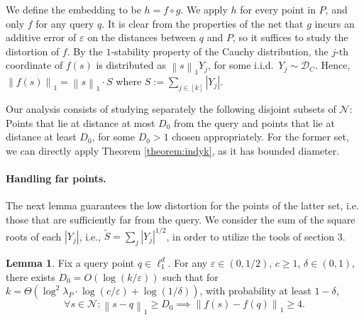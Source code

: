 \documentclass[10pt,a4paper,twoside]{book}
\newcommand{\cauchy}{\mathcal{D}_C}
\newcommand{\eps}{\varepsilon}
\newcommand{\net}{\mathcal{N}}
\newcommand{\norm}[1]{\left \rVert {#1} \right \rVert}
\theoremstyle{definition}
\newtheorem{lemma}[definition]{Lemma}
\theoremstyle{remark}
\begin{document}
We define the embedding to be $h = f \circ g$. We apply $h$ for every point in $P$, and only $f$ for any query $q$. It is clear from the properties of the net that $g$ incurs an additive error of $\eps$ on the distances between $q$ and $P$, so it suffices to study the distortion of $f$. By the $1$-stability property of the Cauchy distribution, the $j$-th coordinate of $f(s)$ is distributed as $\norm{s}_1 Y_j$, for some i.i.d.\ $Y_j \sim \cauchy$. Hence, $\norm{f(s)}_1 = \norm{s}_1 \cdot S$ where $S := \sum_{j \in [k]}|Y_j|$.

Our analysis consists of studying separately the following disjoint subsets of $\net$: Points that lie at distance at most $D_0$ from the query and points that lie at distance at least $D_0$, for some $D_0>1$ chosen appropriately. For the former set, we can directly apply Theorem \ref{theorem:indyk}, as it has bounded diameter.

\paragraph{Handling far points.} The next lemma guarantees the low distortion for the points of the latter set, i.e. those that are sufficiently far from the query. We consider the sum of the square roots of each $|Y_j|$, i.e., $\tilde{S} = \sum_j |Y_j|^{1/2}$, in order to utilize the tools of section 3.

\begin{lemma} \label{lemma:farpoints}
Fix a query point $q \in \ell_1^d$. For any $\eps \in (0,1/2)$, $c \geq 1$, $\delta \in (0,1)$, there exists $D_0=O(\log (k/\eps))$ such that  for $k = \Theta \left( \log^{2}{\lambda_P} \cdot \log ( c / \eps) + \log (1/ \delta) \right)$, with probability at least $1 - \delta$,
\begin{equation*}
    \forall s \in \net : \norm{s-q}_1 \geq D_0 \implies \norm{f(s)-f(q)}_1 \geq 4.
    \end{equation*}
\end{lemma}
\end{document}
